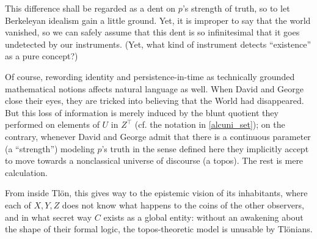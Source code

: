 This difference shall be regarded as a dent on $p$'s strength of truth, so to let Berkeleyan idealism gain a little ground. Yet, it is improper to say that the world vanished, so we can safely assume that this dent is so infinitesimal that it goes undetected by our instruments. (Yet, what kind of instrument detects ``existence'' as a pure concept?)

Of course, rewording identity and persistence-in-time as technically grounded mathematical notions affects natural language as well. When David and George close their eyes, they are tricked into believing that the World had disappeared. But this loss of information is merely induced by the blunt quotient they performed on elements of $U$ in $Z^\top$ (cf. the notation in \autoref{alcuni_set}); on the contrary, whenever David and George admit that there is a continuous parameter (a ``strength'') modeling $p$'s truth in the sense defined here they implicitly accept to move towards a nonclassical universe of discourse (a topos). The rest is mere calculation.

From inside Tl\"on, this gives way to the epistemic vision of its inhabitants, where each of $X,Y,Z$ does not know what happens to the coins of the other observers, and in what secret way $C$ exists as a global entity: without an awakening about the shape of their formal logic, the topos-theoretic model is unusable by Tl\"onians.

